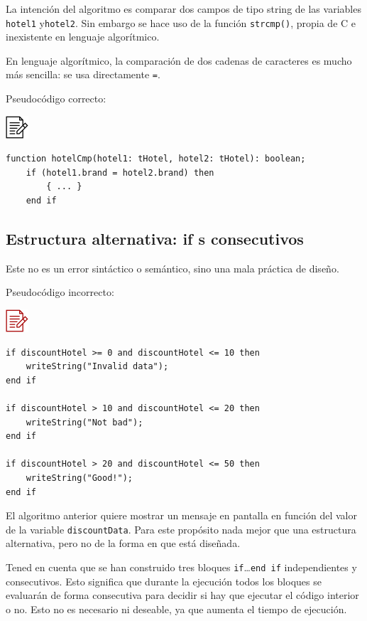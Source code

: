 \documentclass[
]{book}
\begin{document}
La intención del algoritmo es comparar dos campos de tipo string de las variables \texttt{hotel1} y\texttt{hotel2}. Sin embargo se hace uso de la función \texttt{strcmp()}, propia de C e inexistente en lenguaje algorítmico.

En lenguaje algorítmico, la comparación de dos cadenas de caracteres es mucho más sencilla: se usa directamente \texttt{=}.

Pseudocódigo correcto:

\includegraphics{./img/alg.png}

\begin{verbatim}
function hotelCmp(hotel1: tHotel, hotel2: tHotel): boolean;
    if (hotel1.brand = hotel2.brand) then
        { ... }
    end if
\end{verbatim}

\hypertarget{estructura-alternativa-if-s-consecutivos}{%
\subsection{Estructura alternativa: if s consecutivos}\label{estructura-alternativa-if-s-consecutivos}}

Este no es un error sintáctico o semántico, sino una mala práctica de diseño.

Pseudocódigo incorrecto:

\includegraphics{./img/alg_err.png}

\begin{verbatim}
if discountHotel >= 0 and discountHotel <= 10 then
    writeString("Invalid data");
end if

if discountHotel > 10 and discountHotel <= 20 then
    writeString("Not bad");
end if

if discountHotel > 20 and discountHotel <= 50 then
    writeString("Good!");
end if
\end{verbatim}

El algoritmo anterior quiere mostrar un mensaje en pantalla en función del valor de la variable \texttt{discountData}. Para este propósito nada mejor que una estructura alternativa, pero no de la forma en que está diseñada.

Tened en cuenta que se han construido tres bloques \texttt{if}\ldots{}\texttt{end\ if} independientes y consecutivos. Esto significa que durante la ejecución todos los bloques se evaluarán de forma consecutiva para decidir si hay que ejecutar el código interior o no. Esto no es necesario ni deseable, ya que aumenta el tiempo de ejecución.
\end{document}
